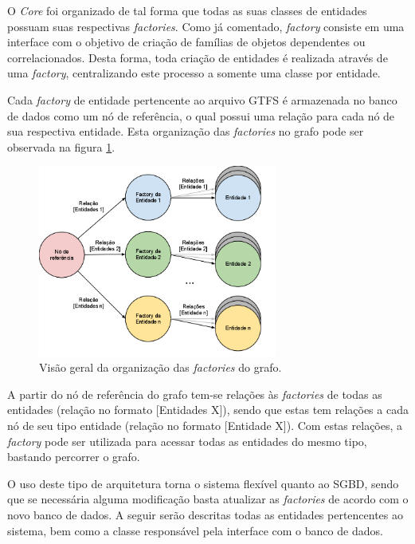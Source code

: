 O \emph{Core} foi organizado de tal forma que todas as suas classes de entidades possuam suas respectivas \emph{factories}.
Como já comentado, \emph{factory} consiste em uma interface com o objetivo de criação de famílias de objetos dependentes ou correlacionados.
Desta forma, toda criação de entidades é realizada através de uma \emph{factory}, centralizando este processo a somente uma classe por entidade.

Cada \emph{factory} de entidade pertencente ao arquivo GTFS é armazenada no banco de dados como um nó de referência, o qual possui uma relação para cada nó de sua respectiva entidade.
Esta organização das \emph{factories} no grafo pode ser observada na figura \ref{fig:grafoFactory}.

\begin{figure}[!htb]
	\centering
	\includegraphics[width=0.7\textwidth]{./imgs/grafoFactory.png}
	\caption[Arquitetura do sistema]{Visão geral da organização das \emph{factories} do grafo.}
	\label{fig:grafoFactory}
\end{figure}

A partir do nó de referência do grafo tem-se relações às \emph{factories} de todas as entidades (relação no formato [Entidades X]), sendo que estas tem relações a cada nó de seu tipo entidade (relação no formato [Entidade X]).
Com estas relações, a \emph{factory} pode ser utilizada para acessar todas as entidades do mesmo tipo, bastando percorrer o grafo.

O uso deste tipo de arquitetura torna o sistema flexível quanto ao SGBD, sendo que se necessária alguma modificação basta atualizar as \emph{factories} de acordo com o novo banco de dados. 
A seguir serão descritas todas as entidades pertencentes ao sistema, bem como a classe responsável pela interface com o banco de dados.

